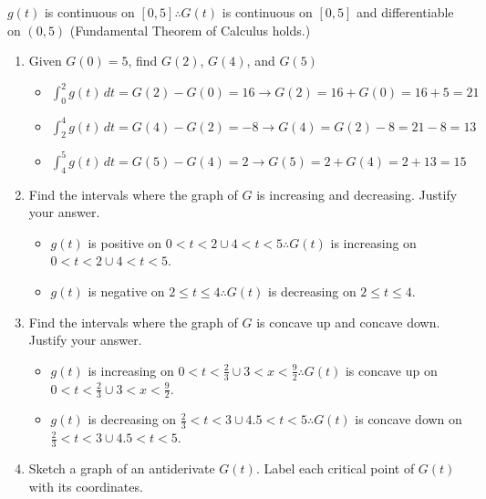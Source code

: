 \documentclass[10pt, letterpaper]{report}
\begin{document}
\begin{enumerate}
    $g(t)$ is continuous on $[0,5] \therefore G(t)$ is continuous on $[0,5]$ and differentiable on $(0,5)$ (Fundamental Theorem of Calculus holds.) \\
		\begin{enumerate}
			\item{Given $G(0)=5$, find $G(2)$, $G(4)$, and $G(5)$\\}
				\begin{itemize}
          \item{$\int_{0}^{2}{g(t)}\,dt=
            G(2)-G(0)=16\rightarrow
            G(2)=16+G(0)=16+5=21$\\}
          \item{$\int_{2}^{4}{g(t)}\,dt=
            G(4)-G(2)=-8\rightarrow
            G(4)=G(2)-8=21-8=13$\\}
          \item{$\int_{4}^{5}{g(t)}\,dt=
            G(5)-G(4)=2\rightarrow
            G(5)=2+G(4)=2+13=15$\\}
        \end{itemize}
			\item{Find the intervals where the graph of $G$ is increasing and decreasing. Justify your answer.\\}
				\begin{itemize}
          \item{$g(t)$ is positive on $0<t<2\cup4<t<5\therefore G(t)$ is increasing on $0<t<2\cup4<t<5$. \\}
          \item{$g(t)$ is negative on $2\leq t\leq 4\therefore G(t)$ is decreasing on $2\leq t\leq 4$.\\}
        \end{itemize}
			\item{Find the intervals where the graph of $G$ is concave up and concave down. Justify your answer.\\}
				\begin{itemize}
          \item{$g(t)$ is increasing on $0<t<\frac{2}{3}\cup 3<x<\frac{9}{2}\therefore G(t)$ is concave up on $0<t<\frac{2}{3}\cup 3<x<\frac{9}{2}$. \\}
          \item{$g(t)$ is decreasing on $\frac{2}{3}<t<3\cup4.5<t<5\therefore G(t)$ is concave down on $\frac{2}{3}<t<3\cup4.5<t<5$.\\}
        \end{itemize}
			\item{Sketch a graph of an antiderivate $G(t)$. Label each critical point of $G(t)$ with its coordinates.\\}


\end{enumerate}
\end{enumerate}
\end{document}
